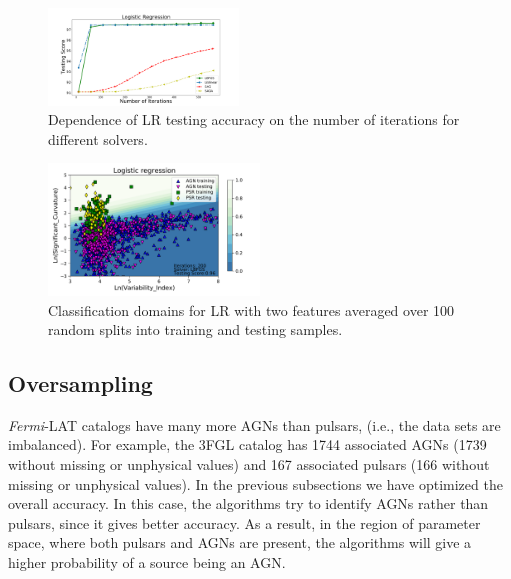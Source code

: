 \documentclass[referee]{aa} %
\newcommand{\lb}{\label}
\newcommand{\Fermi}{\textit{Fermi}\xspace}
\newcommand{\twopicsp}{0.45}
\begin{document}
\begin{figure}[h]
\centering
\includegraphics[width=\twopicsp\textwidth]{plots/lr_train_assocnewfeat.pdf}
\caption{Dependence of LR testing accuracy on the number of iterations for different solvers.}
\label{fig:LR_accuracy}
\end{figure}



\begin{figure}[h]
\centering
\includegraphics[width=0.5\textwidth]{plots/classification_domains/lr_200_lbfgs.pdf}
\caption{Classification domains for LR with two features 
averaged over 100 random splits into training and testing samples.}
\label{fig:LR_domains}
\end{figure}


\subsection{Oversampling}
\lb{sec:oversampling}

\Fermi-LAT catalogs have many more AGNs than pulsars, (i.e., the data sets are imbalanced).
For example, the 3FGL catalog has 1744 associated AGNs (1739 without missing or unphysical values)
and 167 associated pulsars (166 without missing or unphysical values).
In the previous subsections we have optimized the overall accuracy. In this case, the algorithms try to identify AGNs rather than pulsars,
since it gives better accuracy. As a result, in the region of parameter space, where both pulsars and AGNs are present, the algorithms
will give a higher probability of a source being an AGN.
\end{document}
